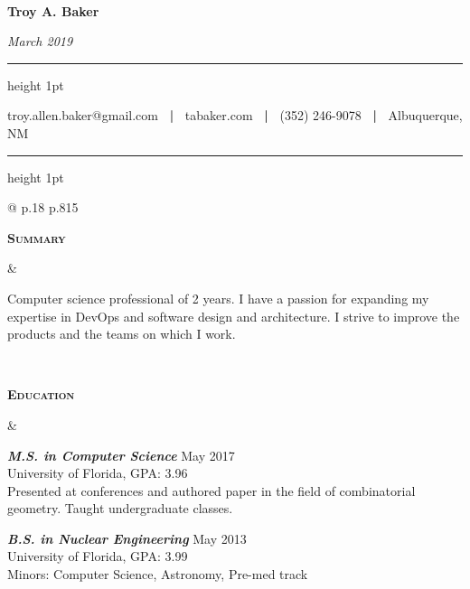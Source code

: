 \documentclass[10pt]{article}
\newcommand{\titlecell}[1]{%
  \begin{minipage}[t]{\linewidth}
    \raggedleft \textbf{#1}
\end{minipage}}
\newcommand{\contentcell}[1]{%
  \begin{minipage}[t]{\linewidth}
    #1
\end{minipage}}
\newcommand{\tablerowskip}{\vspace{4.83mm} \\}
\newcommand\titleline[4][t]{%
  \par\smallskip\noindent%
  \parbox[#1]{.333\textwidth}{\raggedright#2}%
  \parbox[#1]{.333\textwidth}{\centering#3}%
  \parbox[#1]{.333\textwidth}{\raggedleft#4}\par\smallskip%
}
\newcommand{\degreeskip}{\vspace{2mm}}
\newcommand{\contentcellheader}[1]{\textbf{\textsl{#1}}}
\begin{document}
\thispagestyle{empty}

\titleline[t]{\ }{\Large \bf Troy A. Baker}{\textsl{March 2019}}
\smallskip
    {\hrule height 1pt}
    \smallskip
    \centerline{troy.allen.baker@gmail.com \textbf{\ |\ } tabaker.com \textbf{\ |\ } (352) 246-9078 \textbf{\ |\ } Albuquerque, NM}
    \smallskip
        {\hrule height 1pt}
        \smallskip\smallskip


        \noindent
        \begin{tabular}{@{} p{.18\textwidth} p{.815\textwidth}}
          \titlecell{\textsc{Summary}} &
          \contentcell{
            Computer science professional of 2 years. I have a passion for expanding my expertise in DevOps and software design and architecture. I strive to improve the products and the teams on which I work.
          }
          \tablerowskip

          \titlecell{\textsc{Education}} &
          \contentcell{
            \contentcellheader{M.S. in Computer Science} \hfill May 2017 \\
            University of Florida, GPA: 3.96 \\
            Presented at conferences and authored paper in the field of combinatorial geometry. Taught undergraduate classes.
            \degreeskip

            \contentcellheader{B.S. in Nuclear Engineering} \hfill May 2013 \\
            University of Florida, GPA: 3.99 \\
            Minors: Computer Science, Astronomy, Pre-med track
          }
          \tablerowskip


\end{tabular}
\end{document}
